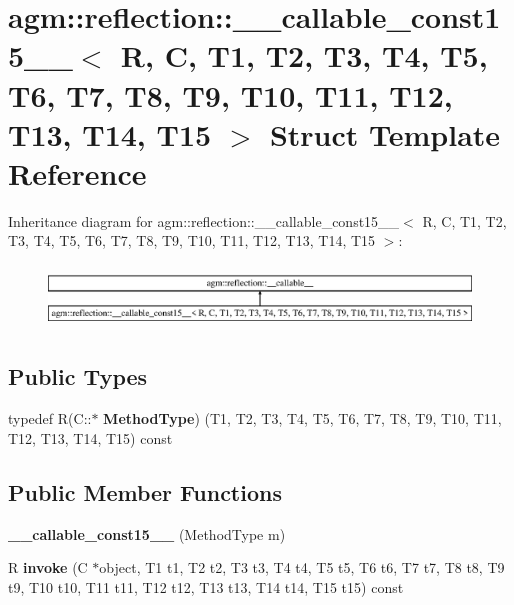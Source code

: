 \hypertarget{structagm_1_1reflection_1_1____callable__const15____}{}\section{agm\+:\+:reflection\+:\+:\+\_\+\+\_\+callable\+\_\+const15\+\_\+\+\_\+$<$ R, C, T1, T2, T3, T4, T5, T6, T7, T8, T9, T10, T11, T12, T13, T14, T15 $>$ Struct Template Reference}
\label{structagm_1_1reflection_1_1____callable__const15____}
Inheritance diagram for agm\+:\+:reflection\+:\+:\+\_\+\+\_\+callable\+\_\+const15\+\_\+\+\_\+$<$ R, C, T1, T2, T3, T4, T5, T6, T7, T8, T9, T10, T11, T12, T13, T14, T15 $>$\+:\begin{figure}[H]
\begin{center}
\leavevmode
\includegraphics[height=1.676647cm]{structagm_1_1reflection_1_1____callable__const15____}
\end{center}
\end{figure}
\subsection*{Public Types}
\begin{DoxyCompactItemize}
\item 
typedef R(C\+::$\ast$ {\bfseries Method\+Type}) (T1, T2, T3, T4, T5, T6, T7, T8, T9, T10, T11, T12, T13, T14, T15) const \hypertarget{structagm_1_1reflection_1_1____callable__const15_____adda6dacb9057c01fc38e17c2f5e90850}{}\label{structagm_1_1reflection_1_1____callable__const15_____adda6dacb9057c01fc38e17c2f5e90850}

\end{DoxyCompactItemize}
\subsection*{Public Member Functions}
\begin{DoxyCompactItemize}
\item 
{\bfseries \+\_\+\+\_\+callable\+\_\+const15\+\_\+\+\_\+} (Method\+Type m)\hypertarget{structagm_1_1reflection_1_1____callable__const15_____ab9bcecadee1f8f09e59c2beb1c4469cc}{}\label{structagm_1_1reflection_1_1____callable__const15_____ab9bcecadee1f8f09e59c2beb1c4469cc}

\item 
R {\bfseries invoke} (C $\ast$object, T1 t1, T2 t2, T3 t3, T4 t4, T5 t5, T6 t6, T7 t7, T8 t8, T9 t9, T10 t10, T11 t11, T12 t12, T13 t13, T14 t14, T15 t15) const \hypertarget{structagm_1_1reflection_1_1____callable__const15_____a6b3091b6a9c97f97f4209e944772b1a1}{}\label{structagm_1_1reflection_1_1____callable__const15_____a6b3091b6a9c97f97f4209e944772b1a1}

\end{DoxyCompactItemize}
